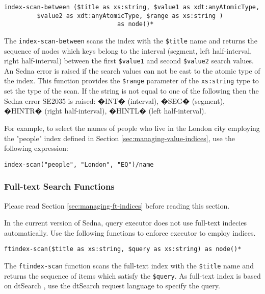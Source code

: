 \documentclass[a4paper,12pt]{article}
\begin{document}
\begin{verbatim}
index-scan-between ($title as xs:string, $value1 as xdt:anyAtomicType,
         $value2 as xdt:anyAtomicType, $range as xs:string )
                               as node()*
\end{verbatim}

The \verb!index-scan-between! scans the index with the \verb!$title! name and returns the sequence of nodes which keys belong to the interval (segment, left half-interval, right half-interval) between the first \verb!$value1! and second \verb!$value2! search values. An Sedna error is raised if the search values can not be cast to the atomic type of the index. This function provides the \verb!$range! parameter of the \verb!xs:string! type to set the type of the scan. If the string is not equal to one of the following then the Sedna error SE2035 is raised: �INT� (interval), �SEG� (segment), �HINTR� (right half-interval), �HINTL� (left half-interval).

For example, to select the names of people who live in the London city employing the "people" index defined in Section \ref{sec:managing-value-indices}, use the following expression:
\begin{verbatim}
index-scan("people", "London", "EQ")/name
\end{verbatim}




\subsubsection{Full-text Search Functions}
\label{sec:ft-fun}
Please read Section \ref{sec:managing-ft-indices} before reading this section.

In the current version of Sedna, query executor does not use full-text indecies automatically. Use the following functions
to enforce executor to employ indices.

\begin{verbatim}
ftindex-scan($title as xs:string, $query as xs:string) as node()*
\end{verbatim}

The \verb!ftindex-scan! function scans the full-text index with the \verb!$title! name and returns the sequence of items which satisfy the \verb!$query!. As full-text index is based on dtSearch \cite{link:dtsearch-engine}, use the dtSearch request language \cite{doc:dtsearch} to specify the query.
\end{document}
